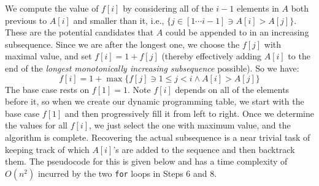 \documentclass[10pt, letterpaper]{article}
\begin{document}
\begin{enumerate}[label={\bfseries Q\arabic*.}]
\begin{enumerate}
        We compute the value of $f[i]$ by considering all of the $i-1$ elements in $A$ both previous
        to $A[i]$ and smaller than it, i.e., $\{j \in [1 \cdots i-1] \ni A[i] > A[j]\}$.
        These are the potential candidates that $A$ could be appended to in an increasing subsequence.
        Since we are after the longest one, we choose the $f[j]$ with maximal value, and set $f[i] =
        1 + f[j]$ (thereby effectively adding $A[i]$ to the end of the \textit{longest monotonically
        increasing subsequence} possible). So we have:
        \[
          f[i] = 1 + \max\big\{f[j] \ni 1 \leq j < i \land A[i] > A[j]\big\}
        \]
        The base case rests on $f[1] = 1$. Note $f[i]$ depends on all of the elements before it, so when we
        create our dynamic programming table, we start with the base case $f[1]$ and then progressively fill it from
        left to right. Once we determine the values for all $f[i]$, we just select the one with maximum
        value, and the algorithm is complete. Recovering the actual subsequence is a near trivial task
        of keeping track of which $A[i]$'s are added to the sequence and then backtrack them. The
        pseudocode for this is given below and has a time complexity of $O(n^2)$ incurred by the
        two \texttt{\color{red!50!black}for} loops in Steps $6$ and $8$.


\end{enumerate}
\end{enumerate}
\end{document}
